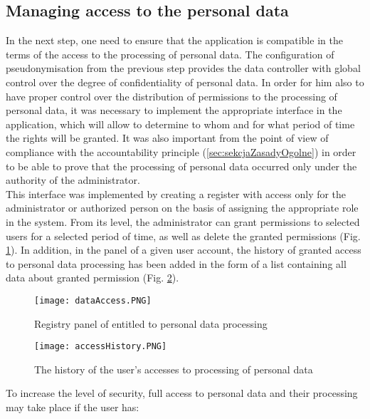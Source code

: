 \documentclass[en, noamssymb]{mgr}
\begin{document}
\subsection{Managing access to the personal data}

In the next step, one need to ensure that the application is compatible in the terms of the access to the processing of personal data. The configuration of pseudonymisation from the previous step provides the data controller with global control over the degree of confidentiality of personal data. In order for him also to have proper control over the distribution of permissions to the processing of personal data, it was necessary to implement the appropriate interface in the application, which will allow to determine to whom and for what period of time the rights will be granted. It was also important from the point of view of compliance with the accountability principle (\ref{sec:sekcjaZasadyOgolne}) in order to be able to prove that the processing of personal data occurred only under the authority of the administrator.\\
\indent This interface was implemented by creating a register with access only for the administrator or authorized person on the basis of assigning the appropriate role in the system. From its level, the administrator can grant permissions to selected users for a selected period of time, as well as delete the granted permissions (Fig. \ref{fig:dataAccessPanel}). In addition, in the panel of a given user account, the history of granted access to personal data processing has been added in the form of a list containing all data about granted permission (Fig. \ref{fig:usersDataAccessHistory}).

\begin{figure}[H]
	\centering
	\texttt{[image: dataAccess.PNG]}
	\caption[Registry panel of entitled to personal data processing]{Registry panel of entitled to personal data processing}
	\label{fig:dataAccessPanel}
\end{figure}

\begin{figure}[H]
	\centering
	\texttt{[image: accessHistory.PNG]}
	\caption[The history of the user's accesses to processing of personal data]{The history of the user's accesses to processing of personal data}
	\label{fig:usersDataAccessHistory}
\end{figure}

To increase the level of security, full access to personal data and their processing may take place if the user has:
\end{document}
